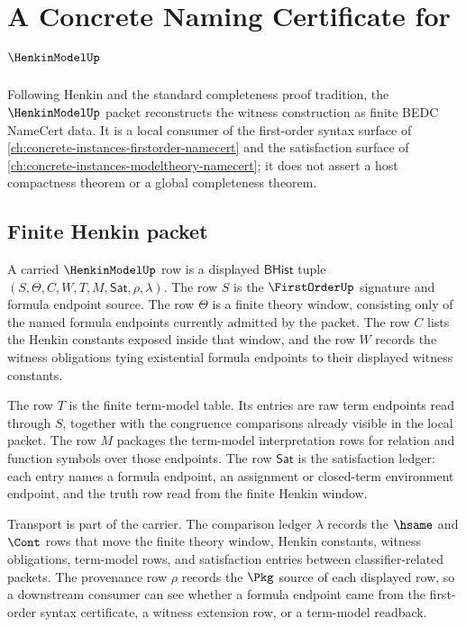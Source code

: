 \chapter{A Concrete Naming Certificate for $\HenkinModelUp$}
\label{ch:concrete-instances-henkin-model-namecert}

Following Henkin and the standard completeness proof tradition, the
$\HenkinModelUp$ packet reconstructs the witness construction as finite BEDC
NameCert data. It is a local consumer of the first-order syntax surface of
\autoref{ch:concrete-instances-firstorder-namecert} and the satisfaction
surface of \autoref{ch:concrete-instances-modeltheory-namecert}; it does not
assert a host compactness theorem or a global completeness theorem.

\section{Finite Henkin packet}
\label{sec:henkin-model-finite-packet}

A carried $\HenkinModelUp$ row is a displayed $\mathsf{BHist}$ tuple
$(S,\Theta,C,W,T,M,\mathsf{Sat},\rho,\lambda)$. The row $S$ is the
$\FirstOrderUp$ signature and formula endpoint source. The row $\Theta$ is a
finite theory window, consisting only of the named formula endpoints currently
admitted by the packet. The row $C$ lists the Henkin constants exposed inside
that window, and the row $W$ records the witness obligations tying existential
formula endpoints to their displayed witness constants.

The row $T$ is the finite term-model table. Its entries are raw term endpoints
read through $S$, together with the congruence comparisons already visible in
the local packet. The row $M$ packages the term-model interpretation rows for
relation and function symbols over those endpoints. The row $\mathsf{Sat}$ is
the satisfaction ledger: each entry names a formula endpoint, an assignment or
closed-term environment endpoint, and the truth row read from the finite
Henkin window.

Transport is part of the carrier. The comparison ledger $\lambda$ records the
$\hsame$ and $\Cont$ rows that move the finite theory window, Henkin
constants, witness obligations, term-model rows, and satisfaction entries
between classifier-related packets. The provenance row $\rho$ records the
$\Pkg$ source of each displayed row, so a downstream consumer can see whether
a formula endpoint came from the first-order syntax certificate, a witness
extension row, or a term-model readback.


